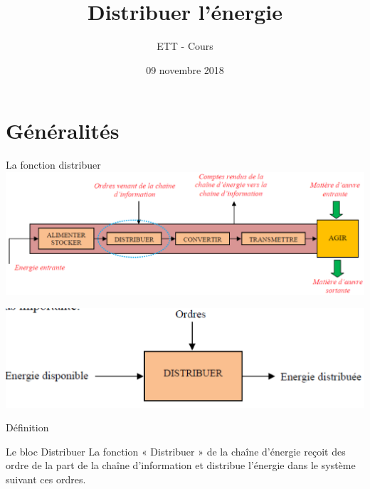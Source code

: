 \documentclass{beamer}
\title{Distribuer l'énergie}
\subtitle{}
\author{ETT - Cours}
\institute{IUT de Cachan}
\date{09 novembre 2018}
\begin{document}
    \begin{frame}
        \maketitle
    \end{frame}

    \begin{frame}
        \tableofcontents
    \end{frame}

    \section{Généralités}
    \begin{frame}{La fonction distribuer}
      \centering
      \includegraphics[width=\textwidth]{images/S03_C02}
    \end{frame}

    \begin{frame}{}
      \centering
      \includegraphics[width=.6\textwidth]{images/distribuer}
    \end{frame}

    \begin{frame}{Définition}
      \begin{alertblock}{Le bloc Distribuer}
        La fonction « Distribuer » de la chaîne d'énergie reçoit des ordre de la part de la chaîne d'information et distribue l'énergie dans le système suivant ces ordres.
      \end{alertblock}

    \end{frame}
\end{document}
